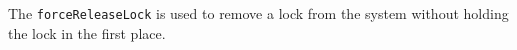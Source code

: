 The \verb+forceReleaseLock+ is used to remove a lock from the system without holding the lock in the first place.
